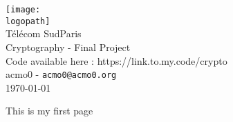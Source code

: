 \documentclass[12pt]{article}
\title{\titlename}
\author{\authorname}
\date{\datevalue}
\makeatletter
\def \titlename {Cryptography - Final Project}
\def \subtitle {Code available here : https://link.to.my.code/crypto}
\def \authorname {acmo0 - {\tt acmo0@acmo0.org}}
\def \logopath {logos/tsp.png}
\def \institutionname {Télécom SudParis}
\def \datevalue {\today}
\makeatother
\begin{document}
\begin{titlepage}
    \begin{center}
        \texttt{[image: \\logopath]}\\[0.5cm]
        {\Huge \institutionname\\[0.5cm]
        \titlename}\\[2cm]
        \linespread{1.2}\LARGE {
        \subtitle}
        \linespread{1}~\\[2cm]
        {\Large\authorname}\\[1cm] 
        \vfill
        {\Large\datevalue}
    \end{center}
\end{titlepage}

\pagestyle{fancy}
\pagebreak

This is my first page
\end{document}
